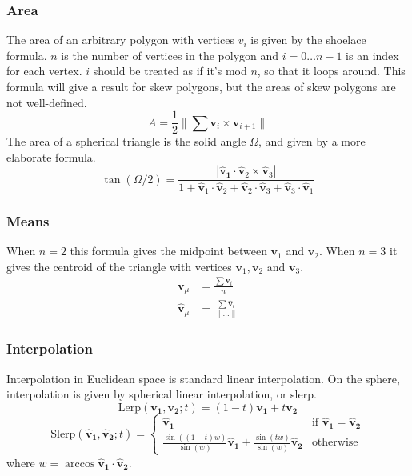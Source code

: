 \documentclass{amsart}[12pt]
\begin{document}
\subsubsection{Area}
The area of an arbitrary polygon with vertices $v_i$ is given by the shoelace
formula. $n$ is the number of vertices in the polygon and
$i = 0 \dots n-1$ is an index for each vertex. $i$ should be treated as if it's
mod $n$, so that it loops around. This formula will give a result for skew
polygons, but the areas of skew polygons are not well-defined.
\begin{equation}
A = \frac{1}{2} \| \sum \mathbf v_i\times \mathbf v_{i+1} \|
\end{equation}
The area of a spherical triangle is the solid angle $\Omega$,
and given by a more elaborate formula. \cite{oosterom}\cite{eriksson}
\begin{equation}
\tan(\Omega/2) = \frac{|\mathbf{\hat{v}_1} \cdot
       \mathbf{\hat{v}}_2 \times \mathbf{\hat{v}}_3|}
       {1+\mathbf{\hat{v}}_1\cdot \mathbf{\hat{v}}_2+\mathbf{\hat{v}}_2
       \cdot \mathbf{\hat{v}}_3+\mathbf{\hat{v}}_3\cdot \mathbf{\hat{v}}_1}
\end{equation}

\subsubsection{Means}
When $n=2$ this formula gives the midpoint between $\mathbf v_1$ and
$\mathbf v_2$. When $n=3$ it gives the centroid of the triangle with
vertices $\mathbf v_1, \mathbf v_2$ and $\mathbf v_3$.
\begin{equation}\begin{split}
\mathbf v_\mu & = \frac{\sum\mathbf v_i}{n} \\
\mathbf{\hat{v}}_\mu & = \frac{\sum\mathbf{\hat{v}}_i}{\|\dots\|}
\end{split}\end{equation}
\subsubsection{Interpolation}
Interpolation in Euclidean space is standard linear interpolation. On the
sphere, interpolation is given by spherical linear interpolation, or slerp.
\begin{equation}
\mathrm{Lerp}(\mathbf{v_1}, \mathbf{v_2}; t) =
       (1-t) \mathbf{v_1} + t \mathbf{v_2}
\end{equation}
\begin{equation}
\mathrm{Slerp}(\mathbf{\hat{v}_1}, \mathbf{\hat{v}_2}; t) =
\begin{cases}\mathbf{\hat{v}_1}
  & \text{if } \mathbf{\hat{v}_1} = \mathbf{\hat{v}_2}\\
        \frac{\sin ((1-t)w)}{\sin (w)} \mathbf{\hat{v}_1} +
       \frac{\sin (tw)}{\sin (w)} \mathbf{\hat{v}_2}
  &\text{otherwise}
      \end{cases}
\end{equation}
where $w = \arccos \mathbf{\hat{v}_1} \cdot \mathbf{\hat{v}_2}$.
\end{document}
